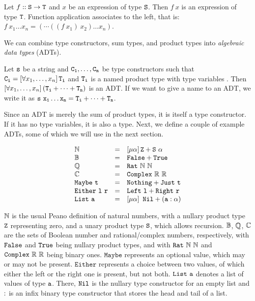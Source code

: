\begin{definition}
	Let $f :: \mathtt{S} \rightarrow \mathtt{T}$ and $x$ be an expression of type $\mathtt{S}$. Then $f\ x$ is an expression of type $\mathtt{T}$. Function application associates to the left, that is: $f\ x_1 \dots x_n = (\cdots((f\ x_1)\ x_2) \dots x_n)$.
\end{definition}

\noindent
We can combine type constructors, sum types, and product types into {\em algebraic data types} (ADTs).

\begin{definition}\label{def:ADT}
Let $\mathtt{s}$ be a string and $\mathtt{C_1},\dots,\mathtt{C_n}$ be type constructors such that $\mathtt{C_i} = \left[\forall x_1,\dots,x_n \right] \mathtt{T_i}$ and $\mathtt{T_i}$ is a named product type with type variables . Then $\left[\forall x_1,\dots,x_n \right] (\mathtt{T_i} + \dots + \mathtt{T_n})$ is an ADT. If we want to give a name to an ADT, we write it as $\mathtt{s\ x_1 \dots x_n = T_i + \dots + T_n}$.
\end{definition}

Since an ADT is merely the sum of product types, it is itself a type constructor. If it has no type variables, it is also a type. Next, we define a couple of example ADTs, some of which we will use in the next section.

\begin{example}
	$$
		\begin{array}{l c l}
			\N & = & \muQ{\alpha}\type{Z + S\ \alpha}\\ 
			\B & = & \type{False + True}\\
			\Q & = & \type{Rat}\ \N\ \N\\
			\C & = & \type{Complex}\ \R\ \R\\
			\type{Maybe\ t} & = & \type{Nothing + Just\ t}\\
			\type{Either\ l\ r} & = & \type{Left\ l + Right\ r}\\
			\type{List\ a} & = & \muQ{\alpha}\ \type{Nil + (a : \alpha)}\\
		\end{array}
	$$
	
	$\mathbb{N}$ is the usual Peano definition of natural numbers, with a nullary product type $\mathtt{Z}$ representing zero, and a unary product type $\mathtt{S}$, which allows recursion. $\mathbb{B}$, $\mathbb{Q}$, $\mathbb{C}$ are the sets of Boolean number and rational/complex numbers, respectively, with $\mathtt{False}$ and $\mathtt{True}$ being nullary product types, and with $\mathtt{Rat}\ \mathbb{N}\ \mathbb{N}$ and $\mathtt{Complex}\ \mathbb{R}\ \mathbb{R}$ being binary ones. $\mathtt{Maybe}$ represents an optional value, which may or may not be present. $\mathtt{Either}$ represents a choice between two values, of which either the left or the right one is present, but not both. $\mathtt{List\ a}$  denotes a list of values of type $\mathtt{a}$. There, $\mathtt{Nil}$ is the nullary type constructor for an empty list and $\mathtt{:}$ is an infix binary type constructor that stores the head and tail of a list.
\end{example}

